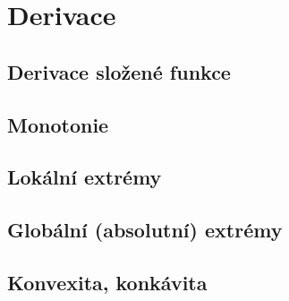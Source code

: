 \section{Derivace}
\subsection{Derivace složené funkce}


\subsection{Monotonie}


\subsection{Lokální extrémy}


\subsection{Globální (absolutní) extrémy}


\subsection{Konvexita, konkávita}


